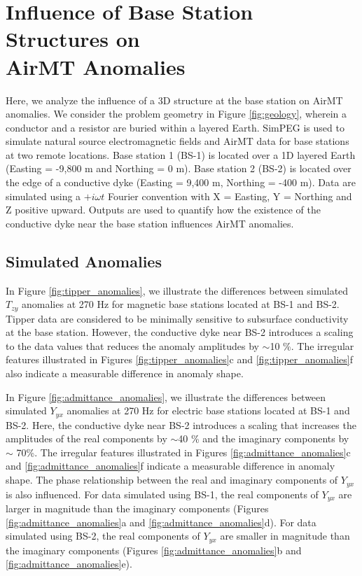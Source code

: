 \documentclass{segabs}
\begin{document}
\vspace{-12pt}
\section{Influence of Base Station Structures on \\AirMT Anomalies}
\vspace{-8pt}

Here, we analyze the influence of a 3D structure at the base station on AirMT anomalies. We consider the problem geometry in Figure \ref{fig:geology}, wherein a conductor and a resistor are buried within a layered Earth. SimPEG \citep{Cockett2015} is used to simulate natural source electromagnetic fields and AirMT data for base stations at two remote locations. Base station 1 (BS-1) is located over a 1D layered Earth (Easting = -9,800 m and Northing = 0 m). Base station 2 (BS-2) is located over the edge of a conductive dyke (Easting = 9,400 m, Northing = -400 m). Data are simulated using a $+i\omega t$ Fourier convention with X = Easting, Y = Northing and Z positive upward. Outputs are used to quantify how the existence of the conductive dyke near the base station influences AirMT anomalies.

\subsection{Simulated Anomalies}
\label{sec:anomalies}
\vspace{-8pt}

In Figure \ref{fig:tipper_anomalies}, we illustrate the differences between simulated $T_{zy}$ anomalies at 270 Hz for magnetic base stations located at BS-1 and BS-2. Tipper data are considered to be minimally sensitive to subsurface conductivity at the base station. However, the conductive dyke near BS-2 introduces a scaling to the data values that reduces the anomaly amplitudes by $\sim$10 \%. The irregular features illustrated in Figures \ref{fig:tipper_anomalies}c and \ref{fig:tipper_anomalies}f also indicate a measurable difference in anomaly shape.

In Figure \ref{fig:admittance_anomalies}, we illustrate the differences between simulated $Y_{yx}$ anomalies at 270 Hz for electric base stations located at BS-1 and BS-2. Here, the conductive dyke near BS-2 introduces a scaling that increases the amplitudes of the real components by $\sim$40 \% and the imaginary components by $\sim$ 70\%. The irregular features illustrated in Figures \ref{fig:admittance_anomalies}c and \ref{fig:admittance_anomalies}f indicate a measurable difference in anomaly shape. The phase relationship between the real and imaginary components of $Y_{yx}$ is also influenced. For data simulated using BS-1, the real components of $Y_{yx}$ are larger in magnitude than the imaginary components (Figures \ref{fig:admittance_anomalies}a and \ref{fig:admittance_anomalies}d). For data simulated using BS-2, the real components of $Y_{yx}$ are smaller in magnitude than the imaginary components (Figures \ref{fig:admittance_anomalies}b and \ref{fig:admittance_anomalies}e).
\end{document}
